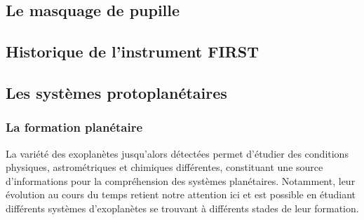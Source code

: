 \subsection{Le masquage de pupille}
\label{sec:MasquagePupille}

\subsection{Historique de l'instrument FIRST}

\subsection{Les systèmes protoplanétaires}
\label{sec:Protoplanetes}

\subsubsection{La formation planétaire}

La variété des exoplanètes jusqu'alors détectées permet d'étudier des conditions physiques, astrométriques et chimiques différentes, constituant une source d'informations pour la compréhension des systèmes planétaires. Notamment, leur évolution au cours du temps retient notre attention ici et est possible en étudiant différents systèmes d'exoplanètes se trouvant à différents stades de leur formation. 

